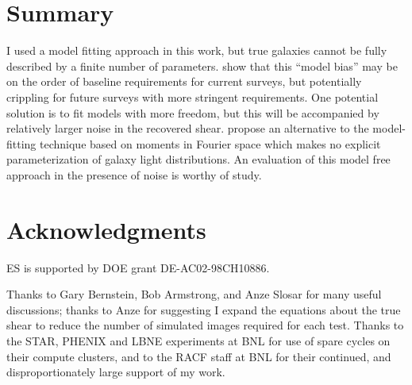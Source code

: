 \documentclass[12pt,preprint]{aastex}
\begin{document}
\section{Summary} \label{sec:summary}

I used a model fitting approach in this work, but true galaxies cannot be fully
described by a finite number of parameters.  \cite{Kacprzak13} show that this
``model bias'' may be on the order of baseline requirements for current
surveys, but potentially crippling for future surveys with more stringent
requirements. One potential solution is to fit models with more freedom, but
this will be accompanied by relatively larger noise in the recovered shear.
\cite{ba14} propose an alternative to the model-fitting technique based on
moments in Fourier space which makes no explicit parameterization of galaxy
light distributions.  An evaluation of this model free approach in the presence
of noise is worthy of study.

\section*{Acknowledgments}

ES is supported by DOE grant DE-AC02-98CH10886.

Thanks to Gary Bernstein, Bob Armstrong, and Anze Slosar for many useful
discussions; thanks to Anze for suggesting I expand the equations about the
true shear to reduce the number of simulated images required for each test.
Thanks to the STAR, PHENIX and LBNE experiments at BNL for use of spare cycles
on their compute clusters, and to the RACF staff at BNL for their continued, and
disproportionately large support of my work.




\end{document}
